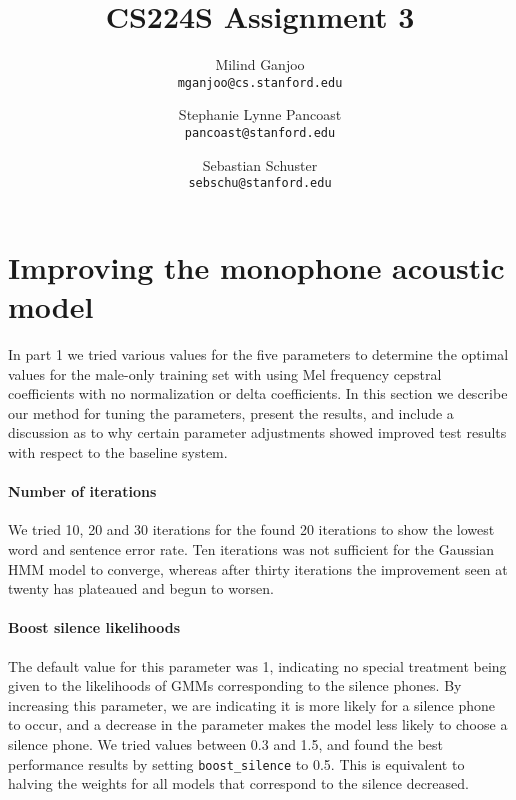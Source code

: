\documentclass[twocolumn, 11pt]{article}
\title{CS224S Assignment 3}
\author{Milind Ganjoo\\\texttt{mganjoo@cs.stanford.edu}
\and%
Stephanie Lynne Pancoast\\\texttt{pancoast@stanford.edu}
\and%
Sebastian Schuster\\\texttt{sebschu@stanford.edu}}
\date{}
\begin{document}
\maketitle
\section{Improving the monophone acoustic model}

In part 1 we tried various values for the five parameters to determine the
optimal values for the male-only training set with using Mel frequency
cepstral coefficients with no normalization or delta coefficients. In this section we describe
our method for tuning the parameters, present the results, and include a
discussion as to why certain parameter adjustments showed improved test
results with respect to the baseline system.


\paragraph{Number of iterations}
We tried 10, 20 and 30 iterations for the found 20 iterations to show the
lowest word and sentence error rate. Ten iterations was not sufficient for the
Gaussian HMM model to converge, whereas after thirty iterations the
improvement seen at twenty has plateaued and begun to worsen. 


\paragraph{Boost silence likelihoods}
The default value for this parameter was 1, indicating no special treatment
being given to the likelihoods of GMMs corresponding to the silence phones. By
increasing this parameter, we are indicating it is more likely for a silence
phone to occur, and a decrease in the parameter makes the model less likely to
choose a silence phone. We tried values between 0.3 and 1.5, and found the
best performance results by setting \texttt{boost\_silence} to 0.5. This is equivalent
to halving the weights for all models that correspond to the silence
decreased.
\end{document}
